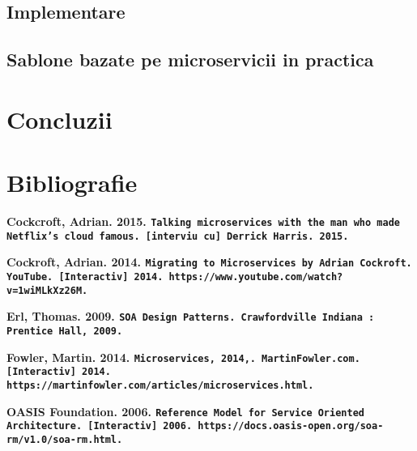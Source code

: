 \documentclass[12pt]{report}
\begin{document}
	\section{Implementare}
	\section{Sablone bazate pe microservicii in practica}
\chapter{Concluzii}
\chapter{Bibliografie}

\begin{flushleft}
\textbf{Cockcroft, Adrian. 2015. \texttt{Talking microservices with the man who made Netflix’s cloud famous. [interviu cu] Derrick Harris. 2015.}}
\end{flushleft}

\begin{flushleft}
\textbf{
Cockroft, Adrian. 2014. \texttt{Migrating to Microservices by Adrian Cockroft. YouTube. [Interactiv] 2014. https://www.youtube.com/watch?v=1wiMLkXz26M.}}
\end{flushleft}

\begin{flushleft}
\textbf{
Erl, Thomas. 2009. \texttt{SOA Design Patterns. Crawfordville Indiana : Prentice Hall, 2009.}}
\end{flushleft}

\begin{flushleft}
\textbf{
Fowler, Martin. 2014. \texttt{Microservices, 2014,. MartinFowler.com. [Interactiv] 2014. https://martinfowler.com/articles/microservices.html.}}
\end{flushleft}

\begin{flushleft}
\textbf{
OASIS Foundation. 2006. \texttt{Reference Model for Service Oriented Architecture. [Interactiv] 2006. https://docs.oasis-open.org/soa-rm/v1.0/soa-rm.html.}}
\end{flushleft}
\end{document}
